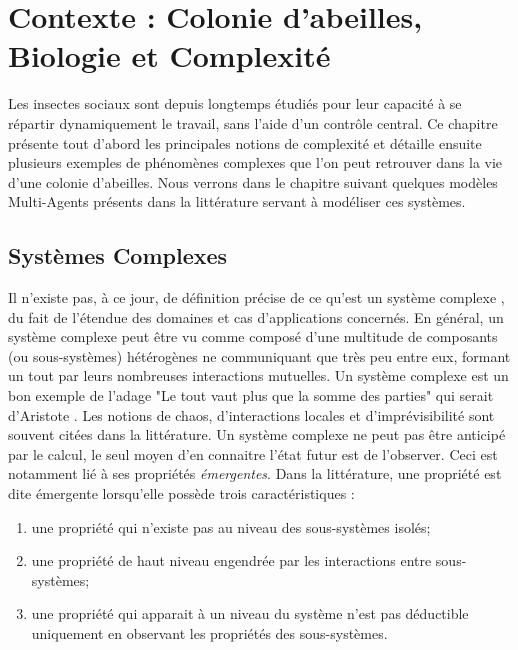 \chapter{Contexte : Colonie d'abeilles, Biologie et Complexité}
\label{ChapitreContexte}
	
	Les insectes sociaux sont depuis longtemps étudiés pour leur capacité à se répartir dynamiquement le travail, sans l'aide d'un contrôle central. Ce chapitre présente tout d'abord les principales notions de complexité et détaille ensuite plusieurs exemples de phénomènes complexes que l'on peut retrouver dans la vie d'une colonie d'abeilles. Nous verrons dans le chapitre suivant quelques modèles Multi-Agents présents dans la littérature servant à modéliser ces systèmes.

	
		\section{Systèmes Complexes}
		
			Il n'existe pas, à ce jour, de définition précise de ce qu'est un système complexe \cite{heylighen_complexity_2008}, du fait de l'étendue des domaines et cas d'applications concernés. En général, un système complexe peut être vu comme composé d'une multitude de composants (ou sous-systèmes) hétérogènes ne communiquant que très peu entre eux, formant un tout par leurs nombreuses interactions mutuelles. Un système complexe est un bon exemple de l'adage "Le tout vaut plus que la somme des parties" qui serait d'Aristote \cite{edmonds_what_1995}. Les notions de chaos, d'interactions locales et d'imprévisibilité sont souvent citées dans la littérature. Un système complexe ne peut pas être anticipé par le calcul, le seul moyen d'en connaitre l'état futur est de l'observer. 
			Ceci est notamment lié à ses propriétés \textit{émergentes}. Dans la littérature, une propriété est dite émergente lorsqu'elle possède trois caractéristiques \cite{breckling_emergent_2005} :
			\begin{enumerate}
				\item une propriété qui n'existe pas au niveau des sous-systèmes isolés;
				\item une propriété de haut niveau engendrée par les interactions entre sous-systèmes;
				\item une propriété qui apparait à un niveau du système n'est pas déductible uniquement en observant les propriétés des sous-systèmes.
			\end{enumerate}
			
